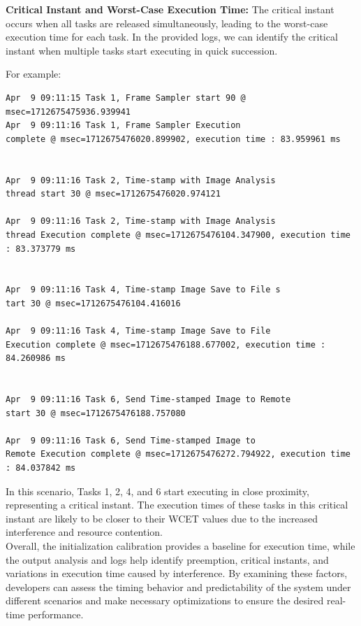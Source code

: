 \documentclass[a4paper,11pt]{article}%
\newenvironment{qanda}{\setlength{\parindent}{0pt}}{\bigskip}
\begin{document}
\begin{qanda}
\begin{enumerate}
			\textbf{Critical Instant and Worst-Case Execution Time:}
			The critical instant occurs when all tasks are released simultaneously, leading to the worst-case execution time for each task. In the provided logs, we can identify the critical instant when multiple tasks start executing in quick succession.

			For example:

			\begin{lstlisting}
Apr  9 09:11:15 Task 1, Frame Sampler start 90 @ msec=1712675475936.939941
Apr  9 09:11:16 Task 1, Frame Sampler Execution
complete @ msec=1712675476020.899902, execution time : 83.959961 ms


Apr  9 09:11:16 Task 2, Time-stamp with Image Analysis 
thread start 30 @ msec=1712675476020.974121

Apr  9 09:11:16 Task 2, Time-stamp with Image Analysis
thread Execution complete @ msec=1712675476104.347900, execution time : 83.373779 ms


Apr  9 09:11:16 Task 4, Time-stamp Image Save to File s
tart 30 @ msec=1712675476104.416016

Apr  9 09:11:16 Task 4, Time-stamp Image Save to File 
Execution complete @ msec=1712675476188.677002, execution time : 84.260986 ms


Apr  9 09:11:16 Task 6, Send Time-stamped Image to Remote 
start 30 @ msec=1712675476188.757080

Apr  9 09:11:16 Task 6, Send Time-stamped Image to
Remote Execution complete @ msec=1712675476272.794922, execution time : 84.037842 ms
\end{lstlisting}

			In this scenario, Tasks 1, 2, 4, and 6 start executing in close proximity, representing a critical instant. The execution times of these tasks in this critical instant are likely to be closer to their WCET values due to the increased interference and resource contention.\\

			Overall, the initialization calibration provides a baseline for execution time, while the output analysis and logs help identify preemption, critical instants, and variations in execution time caused by interference. By examining these factors, developers can assess the timing behavior and predictability of the system under different scenarios and make necessary optimizations to ensure the desired real-time performance.\\



\end{enumerate}
\end{qanda}
\end{document}
